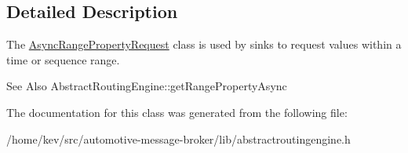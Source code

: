\subsection{Detailed Description}
The \hyperlink{classAsyncRangePropertyRequest}{Async\-Range\-Property\-Request} class is used by sinks to request values within a time or sequence range. 

\begin{DoxySeeAlso}{See Also}
Abstract\-Routing\-Engine\-::get\-Range\-Property\-Async 
\end{DoxySeeAlso}


The documentation for this class was generated from the following file\-:\begin{DoxyCompactItemize}
\item 
/home/kev/src/automotive-\/message-\/broker/lib/abstractroutingengine.\-h\end{DoxyCompactItemize}
